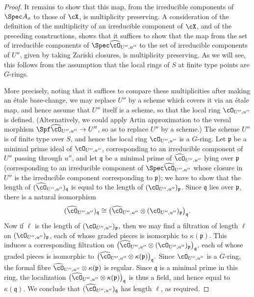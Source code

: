 \begin{proof}
It remains to show that this map, from the irreducible components
of $\Spec A_x$ to those of $\cX$, is multiplicity preserving.
A consideration of the definition of the multiplicity of an irreducible
component of $\cX$, and of the preceding constructions,
shows that it suffices to show that the map from the set of 
irreducible components of $\Spec \widehat{\cO}_{U'',u''}$ to
the set of irreducible components of $U''$, given by taking Zariski closures,
is multiplicity preserving.  As we will see, this follows from the assumption
that the local rings of $S$ at finite type points are $G$-rings. 

More precisely, noting that it suffices to compare these multiplicities
after making an \'etale base-change, we may replace $U''$ 
by a scheme which covers it via an \'etale map, and hence assume
that $U''$ itself is a scheme, so that the local ring
$\cO_{U'',u''}$ is defined. (Alternatively, we could apply
Artin approximation to the versal morphism
$\Spf \widehat{\cO}_{U'',u''} \to U''$, so as to replace $U''$ by a scheme.)  
The scheme $U''$ is of finite type over $S$,
and hence the local ring $\cO_{U'',u''}$ is a $G$-ring.
Let $\mathfrak p$ be a minimal prime ideal of $\cO_{U'',u''}$,
corresponding to an irreducible component of $U''$ passing
through $u''$, and let $\mathfrak q$ be a minimal prime
of $\widehat{\cO}_{U'',u''}$ lying over $\mathfrak p$
(corresponding to an irreducible component of $\Spec \widehat{\cO}_{U'',u''}$
whose closure in $U''$ is the irreducible component corresponding to
$\mathfrak p$);
we have to show that the length
of $(\widehat{\cO}_{U'',u''})_{\mathfrak q}$ is equal to the length of
$(\cO_{U'',u''})_{\mathfrak p}$.
Since $\mathfrak q$ lies over $\mathfrak p,$
there is a natural isomorphism
$$ (\widehat{\cO}_{U'',u''})_{\mathfrak q}
\cong 
\bigl(\widehat{\cO}_{U'',u''} \otimes
(\cO_{U'',u''})_{\mathfrak p}\bigr)_{\mathfrak q}.$$
Now if $\ell$ is the length of 
$(\cO_{U'',u''})_{\mathfrak p},$
then we may find a filtration of length $\ell$ on
$(\cO_{U'',u''})_{\mathfrak p}$, each of whose graded
pieces is isomorphic to $\kappa(\mathfrak p)$.
This induces a corresponding filtration on
$\bigl(\widehat{\cO}_{U'',u''} \otimes
(\cO_{U'',u''})_{\mathfrak p}\bigr)_{\mathfrak q},$
each of whose graded pieces is isomorphic to 
$\bigl(\widehat{\cO}_{U'',u''} \otimes
\kappa(\mathfrak p)\bigr)_{\mathfrak q}.$
Since $\cO_{U'',u''}$ is a $G$-ring,
the formal fibre 
$\widehat{\cO}_{U'',u''} \otimes
\kappa(\mathfrak p)$ is regular.
Since $\mathfrak q$ is a minimal prime in this ring,
the localization
$\bigl(\widehat{\cO}_{U'',u''} \otimes
\kappa(\mathfrak p)\bigr)_{\mathfrak q}$
is thus a field, and hence equal to $\kappa(\mathfrak q)$.
We conclude that $(\widehat{\cO}_{U'',u''})_{\mathfrak q}$
has length $\ell$, as required.




\end{proof}

